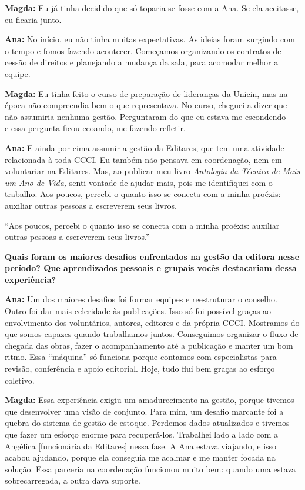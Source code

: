 \documentclass{gescons}
\begin{document}
\begin{multicols}{2}
\textbf{Magda:} Eu já tinha decidido que só toparia se fosse com a Ana. Se ela aceitasse, eu ficaria junto.

\textbf{Ana:} No início, eu não tinha muitas expectativas. As ideias foram surgindo com o tempo e fomos fazendo acontecer. Começamos organizando os contratos de cessão de direitos e planejando a mudança da sala, para acomodar melhor a equipe.

\textbf{Magda:} Eu tinha feito o curso de preparação de lideranças da Unicin, mas na época não compreendia bem o que representava. No curso, cheguei a dizer que não assumiria nenhuma gestão. Perguntaram do que eu estava me escondendo --- e essa pergunta ficou ecoando, me fazendo refletir.

\textbf{Ana:} E ainda por cima assumir a gestão da Editares, que tem uma atividade relacionada à toda CCCI. Eu também não pensava em coordenação, nem em voluntariar na Editares. Mas, ao publicar meu livro \emph{Antologia da Técnica de Mais um Ano de Vida,} senti vontade de ajudar mais, pois me identifiquei com o trabalho. Aos poucos, percebi o quanto isso se conecta com a minha proéxis: auxiliar outras pessoas a escreverem seus livros.

\begin{pullquote}
``Aos poucos, percebi o quanto isso se conecta com a minha proéxis: auxiliar outras pessoas a escreverem seus livros.''
\end{pullquote}

\textbf{Quais foram os maiores desafios enfrentados na gestão da editora nesse período? Que aprendizados pessoais e grupais vocês destacariam dessa experiência?}

\textbf{Ana:} Um dos maiores desafios foi formar equipes e reestruturar o conselho. Outro foi dar mais celeridade às publicações. Isso só foi possível graças ao envolvimento dos voluntários, autores, editores e da própria CCCI. Mostramos do que somos capazes quando trabalhamos juntos. Conseguimos organizar o fluxo de chegada das obras, fazer o acompanhamento até a publicação e manter um bom ritmo. Essa ``máquina'' só funciona porque contamos com especialistas para revisão, conferência e apoio editorial. Hoje, tudo flui bem graças ao esforço coletivo.

\textbf{Magda:} Essa experiência exigiu um amadurecimento na gestão, porque tivemos que desenvolver uma visão de conjunto. Para mim, um desafio marcante foi a quebra do sistema de gestão de estoque. Perdemos dados atualizados e tivemos que fazer um esforço enorme para recuperá-los. Trabalhei lado a lado com a Angélica {[}funcionária da Editares{]} nessa fase. A Ana estava viajando, e isso acabou ajudando, porque ela conseguia me acalmar e me manter focada na solução. Essa parceria na coordenação funcionou muito bem: quando uma estava sobrecarregada, a outra dava suporte.



\end{multicols}
\end{document}
